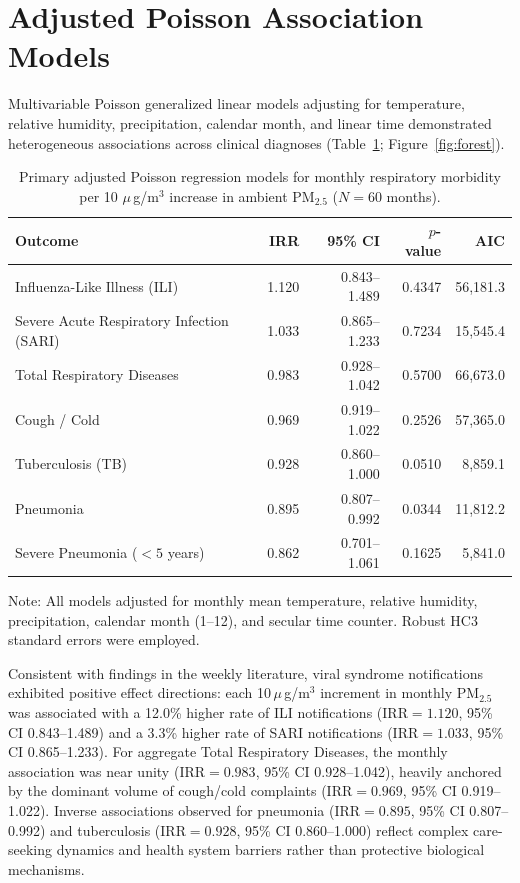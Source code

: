 \documentclass[12pt,a4paper]{report}
\newcommand{\pmfive}{PM$_{2.5}$}
\newcommand{\ugm}{\ensuremath{\mu}\,g/m$^3$}
\begin{document}
\section{Adjusted Poisson Association Models}
Multivariable Poisson generalized linear models adjusting for temperature, relative humidity, precipitation, calendar month, and linear time demonstrated heterogeneous associations across clinical diagnoses (Table~\ref{tab:monthly_poisson}; Figure~\ref{fig:forest}). 

\begin{table}[htbp]
\centering
\caption{Primary adjusted Poisson regression models for monthly respiratory morbidity per 10 \ugm{} increase in ambient \pmfive{} ($N=60$ months).}
\label{tab:monthly_poisson}
\begin{tabular}{lrrrr}
\toprule
Outcome & IRR & 95\% CI & $p$-value & AIC \\
\midrule
Influenza-Like Illness (ILI) & 1.120 & 0.843--1.489 & 0.4347 & 56,181.3 \\
Severe Acute Respiratory Infection (SARI) & 1.033 & 0.865--1.233 & 0.7234 & 15,545.4 \\
Total Respiratory Diseases & 0.983 & 0.928--1.042 & 0.5700 & 66,673.0 \\
Cough / Cold & 0.969 & 0.919--1.022 & 0.2526 & 57,365.0 \\
Tuberculosis (TB) & 0.928 & 0.860--1.000 & 0.0510 & 8,859.1 \\
Pneumonia & 0.895 & 0.807--0.992 & 0.0344 & 11,812.2 \\
Severe Pneumonia ($<5$ years) & 0.862 & 0.701--1.061 & 0.1625 & 5,841.0 \\
\bottomrule
\end{tabular}
\begin{flushleft}\footnotesize
Note: All models adjusted for monthly mean temperature, relative humidity, precipitation, calendar month (1--12), and secular time counter. Robust HC3 standard errors were employed.
\end{flushleft}
\end{table}

Consistent with findings in the weekly literature, viral syndrome notifications exhibited positive effect directions: each 10\,\ugm{} increment in monthly \pmfive{} was associated with a 12.0\% higher rate of ILI notifications ($\mathrm{IRR} = 1.120$, 95\% CI 0.843--1.489) and a 3.3\% higher rate of SARI notifications ($\mathrm{IRR} = 1.033$, 95\% CI 0.865--1.233). For aggregate Total Respiratory Diseases, the monthly association was near unity ($\mathrm{IRR} = 0.983$, 95\% CI 0.928--1.042), heavily anchored by the dominant volume of cough/cold complaints ($\mathrm{IRR} = 0.969$, 95\% CI 0.919--1.022). Inverse associations observed for pneumonia ($\mathrm{IRR} = 0.895$, 95\% CI 0.807--0.992) and tuberculosis ($\mathrm{IRR} = 0.928$, 95\% CI 0.860--1.000) reflect complex care-seeking dynamics and health system barriers rather than protective biological mechanisms.
\end{document}
